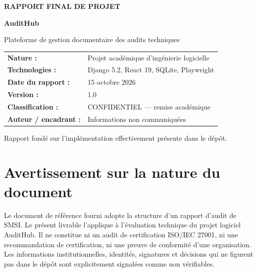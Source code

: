 \documentclass[12pt,a4paper,oneside]{report}
\begin{document}
\begin{titlepage}
  \pagecolor{AuditNavy}\color{white}
  \vspace*{1.2cm}
  {\Large\bfseries RAPPORT FINAL DE PROJET\par}
  \vspace{1.2cm}
  {\Huge\bfseries AuditHub\par}
  \vspace{0.4cm}
  {\LARGE Plateforme de gestion documentaire des audits techniques\par}
  \vfill
  \begin{tabular}{@{}ll@{}}
    \textbf{Nature :} & Projet acad\'emique d'ing\'enierie logicielle\\
    \textbf{Technologies :} & Django 5.2, React 19, SQLite, Playwright\\
    \textbf{Date du rapport :} & 15 octobre 2026\\
    \textbf{Version :} & 1.0\\
    \textbf{Classification :} & CONFIDENTIEL --- remise acad\'emique\\
    \textbf{Auteur / encadrant :} & Informations non communiqu\'ees\\
  \end{tabular}
  \vfill
  {\large Rapport fond\'e sur l'impl\'ementation effectivement pr\'esente dans le d\'ep\^ot.\par}
\end{titlepage}
\nopagecolor\color{black}

\chapter*{Avertissement sur la nature du document}
Le document de r\'ef\'erence fourni adopte la structure d'un rapport d'audit de SMSI. Le pr\'esent livrable l'applique \`a l'\'evaluation technique du projet logiciel AuditHub. Il ne constitue ni un audit de certification ISO/IEC 27001, ni une recommandation de certification, ni une preuve de conformit\'e d'une organisation. Les informations institutionnelles, identit\'es, signatures et d\'ecisions qui ne figurent pas dans le d\'ep\^ot sont explicitement signal\'ees comme non v\'erifiables.

\tableofcontents
\listoffigures
\listoftables
\clearpage
{}
















\end{document}
